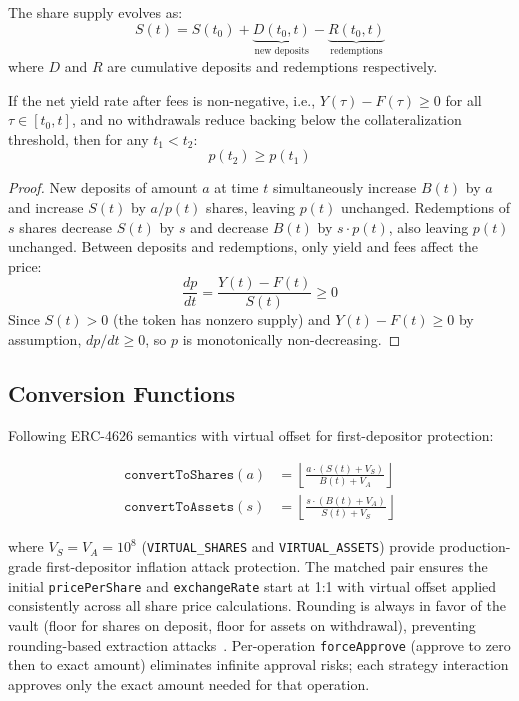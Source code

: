 The share supply evolves as:
\begin{equation}\label{eq:supply}
  S(t) = S(t_0) + \underbrace{D(t_0, t)}_{\text{new deposits}} - \underbrace{R(t_0, t)}_{\text{redemptions}}
\end{equation}
where $D$ and $R$ are cumulative deposits and redemptions respectively.

\begin{theorem}\label{thm:monotone}
If the net yield rate after fees is non-negative, i.e., $Y(\tau) - F(\tau) \geq 0$ for all $\tau \in [t_0, t]$, and no withdrawals reduce backing below the collateralization threshold, then for any $t_1 < t_2$:
\begin{equation}
  p(t_2) \geq p(t_1)
\end{equation}
\end{theorem}

\begin{proof}
New deposits of amount $a$ at time $t$ simultaneously increase $B(t)$ by $a$ and increase $S(t)$ by $a/p(t)$ shares, leaving $p(t)$ unchanged. Redemptions of $s$ shares decrease $S(t)$ by $s$ and decrease $B(t)$ by $s \cdot p(t)$, also leaving $p(t)$ unchanged. Between deposits and redemptions, only yield and fees affect the price:
\begin{equation}
  \frac{dp}{dt} = \frac{Y(t) - F(t)}{S(t)} \geq 0
\end{equation}
Since $S(t) > 0$ (the token has nonzero supply) and $Y(t) - F(t) \geq 0$ by assumption, $dp/dt \geq 0$, so $p$ is monotonically non-decreasing.
\end{proof}

\subsection{Conversion Functions}

Following ERC-4626 semantics with virtual offset for first-depositor protection:

\begin{align}
  \texttt{convertToShares}(a) &= \left\lfloor \frac{a \cdot (S(t) + V_S)}{B(t) + V_A} \right\rfloor \label{eq:toShares}\\[4pt]
  \texttt{convertToAssets}(s) &= \left\lfloor \frac{s \cdot (B(t) + V_A)}{S(t) + V_S} \right\rfloor \label{eq:toAssets}
\end{align}

where $V_S = V_A = 10^8$ (\texttt{VIRTUAL\_SHARES} and \texttt{VIRTUAL\_ASSETS}) provide production-grade first-depositor inflation attack protection. The matched pair ensures the initial \texttt{pricePerShare} and \texttt{exchangeRate} start at 1:1 with virtual offset applied consistently across all share price calculations. Rounding is always in favor of the vault (floor for shares on deposit, floor for assets on withdrawal), preventing rounding-based extraction attacks~\cite{erc4626}. Per-operation \texttt{forceApprove} (approve to zero then to exact amount) eliminates infinite approval risks; each strategy interaction approves only the exact amount needed for that operation.

